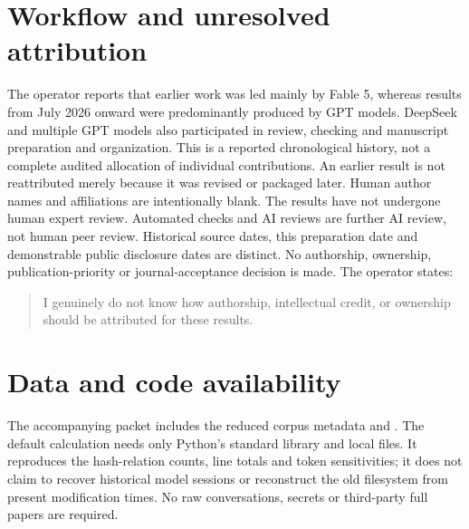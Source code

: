 \documentclass[11pt,a4paper]{article}
\begin{document}
\section*{Workflow and unresolved attribution}
The operator reports that earlier work was led mainly by Fable 5, whereas
results from July 2026 onward were predominantly produced by GPT models.
DeepSeek and multiple GPT models also participated in review, checking and
manuscript preparation and organization. This is a reported chronological
history, not a complete audited allocation of individual contributions.
An earlier result is not reattributed merely because it was revised or
packaged later. Human author names and affiliations are intentionally blank.
The results have not undergone human expert review. Automated checks and AI
reviews are further AI review, not human peer review. Historical source dates,
this preparation date and demonstrable public disclosure dates are distinct.
No authorship, ownership, publication-priority or journal-acceptance decision
is made. The operator states:
\begin{quote}
I genuinely do not know how authorship, intellectual credit, or ownership should be attributed for these results.
\end{quote}

\section*{Data and code availability}
The accompanying packet includes the reduced corpus metadata and
. The default calculation needs only Python's standard
library and local files. It reproduces the hash-relation counts, line totals
and token sensitivities; it does not claim to recover historical model
sessions or reconstruct the old filesystem from present modification times.
No raw conversations, secrets or third-party full papers are required.



\end{document}
